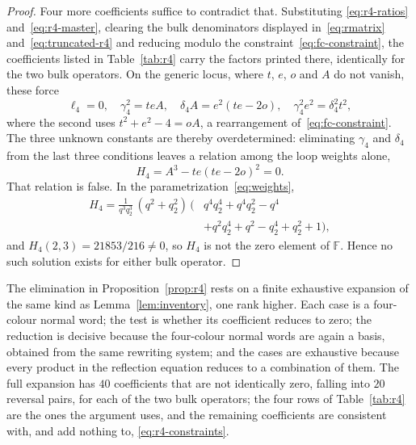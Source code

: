\documentclass[
  aps,pre,
  reprint,
  superscriptaddress,
  amsmath,amssymb,
  floatfix
]{revtex4-2}
\theoremstyle{plain}
\theoremstyle{definition}
\theoremstyle{remark}
\newcommand{\Fld}{\mathbb{F}}
\begin{document}
\begin{proof}
Four more coefficients suffice to contradict that. Substituting
\eqref{eq:r4-ratios} and~\eqref{eq:r4-master}, clearing the bulk denominators
displayed in~\eqref{eq:rmatrix} and~\eqref{eq:truncated-r4} and reducing
modulo the constraint~\eqref{eq:fc-constraint}, the coefficients listed in
Table~\ref{tab:r4} carry the factors printed there, identically for the two
bulk operators. On the generic locus, where $t$, $e$, $o$ and $A$ do not
vanish, these force
\begin{equation}
 \ell_4=0,\quad \gamma_4^2=teA,\quad
 \delta_4A=e^2(te-2o),\quad \gamma_4^2e^2=\delta_4^2t^2 ,
 \label{eq:r4-constraints}
\end{equation}
where the second uses $t^2+e^2-4=oA$, a rearrangement
of~\eqref{eq:fc-constraint}. The three unknown constants are thereby
overdetermined: eliminating $\gamma_4$ and $\delta_4$ from the last three
conditions leaves a relation among the loop weights alone,
\begin{equation}
 H_4=A^3-te(te-2o)^2=0 .
 \label{eq:h4}
\end{equation}
That relation is false. In the parametrization~\eqref{eq:weights},
\begin{equation}
\begin{split}
 H_4=\frac{1}{q^3q_2^3}\,(q^2+q_2^2)\,\bigl(&q^4q_2^4+q^4q_2^2-q^4\\
 &+q^2q_2^4+q^2-q_2^4+q_2^2+1\bigr),
\end{split}
 \label{eq:h4-factor}
\end{equation}
and $H_4(2,3)=21853/216\ne0$, so $H_4$ is not the zero element of $\Fld$.
Hence no such solution exists for either bulk operator.
\end{proof}

The elimination in Proposition~\ref{prop:r4} rests on a finite exhaustive
expansion of the same kind as Lemma~\ref{lem:inventory}, one rank higher. Each
case is a four-colour normal word; the test is whether its coefficient reduces
to zero; the reduction is decisive because the four-colour normal words are
again a basis, obtained from the same rewriting system; and the cases are
exhaustive because every product in the reflection equation reduces to a
combination of them. The full expansion has $40$ coefficients that are not
identically zero, falling into $20$ reversal pairs, for each of the two bulk
operators; the four rows of Table~\ref{tab:r4} are the ones the argument uses,
and the remaining coefficients are consistent with, and add nothing to,
\eqref{eq:r4-constraints}.
\end{document}
